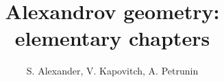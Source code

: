 \frontmatter
\title{Alexandrov geometry:\\
elementary chapters}
\author{S. Alexander, V. Kapovitch, A. Petrunin}
\maketitle